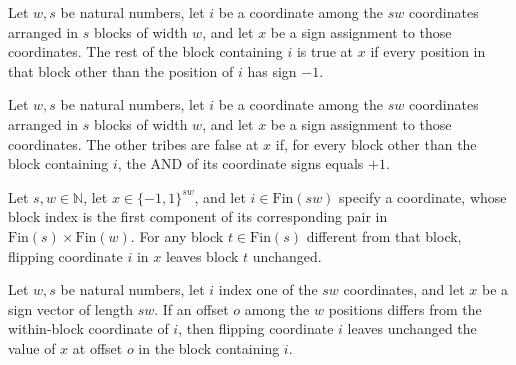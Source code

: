\begin{definition}
\label{FABL.TribesRestTrue}
\leanok
{}
Let $w,s$ be natural numbers, let $i$ be a coordinate among the $s w$ coordinates
arranged in $s$ blocks of width $w$, and let $x$ be a sign assignment to those
coordinates. The rest of the block containing $i$ is true at $x$ if every position in
that block other than the position of $i$ has sign $-1$.
\end{definition}

\begin{definition}
\label{FABL.TribesOthersFalse}
\leanok
{}
Let $w,s$ be natural numbers, let $i$ be a coordinate among the $s w$ coordinates
arranged in $s$ blocks of width $w$, and let $x$ be a sign assignment to those
coordinates. The other tribes are false at $x$ if, for every block other than the block
containing $i$, the AND of its coordinate signs equals $+1$.
\end{definition}

\begin{theorem}
\label{FABL.inputBlock_flipCoordinate_of_ne_tribe}
\leanok
{}
Let $s,w\in\mathbb N$, let $x\in\{−1,1\}^{sw}$, and let $i\in\mathrm{Fin}(sw)$ specify a
coordinate, whose block index is the first component of its corresponding pair in
$\mathrm{Fin}(s)\times\mathrm{Fin}(w)$. For any block $t\in\mathrm{Fin}(s)$ different
from that block, flipping coordinate $i$ in $x$ leaves block $t$ unchanged.
\end{theorem}

\begin{theorem}
\label{FABL.inputBlock_flipCoordinate_of_ne_offset}
\leanok
{}
Let $w,s$ be natural numbers, let $i$ index one of the $sw$ coordinates, and let $x$ be
a sign vector of length $sw$. If an offset $o$ among the $w$ positions differs from the
within-block coordinate of $i$, then flipping coordinate $i$ leaves unchanged the value
of $x$ at offset $o$ in the block containing $i$.
\end{theorem}

